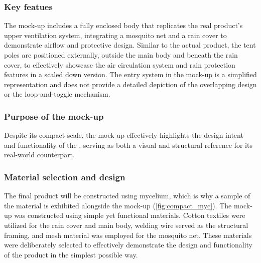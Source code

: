 \documentclass{article}
\begin{document}
\subsubsection{Key featues}
The mock-up includes a fully enclosed body that replicates the real product’s upper
ventilation system, integrating a mosquito net and a rain cover to demonstrate airflow
and protective design. Similar to the actual product, the tent poles are positioned
externally, outside the main body and beneath the rain cover, to effectively showcase the
air circulation system and rain protection features in a scaled down version. The entry
system in the mock-up is a simplified representation and does not provide a detailed
depiction of the overlapping design or the loop-and-toggle mechanism.

\subsubsection{Purpose of the mock-up}
Despite its compact scale, the mock-up effectively highlights the design intent and
functionality of the \myc, serving as both a visual and structural reference for
its real-world counterpart.

\subsubsection{Material selection and design}
The final product will be constructed using mycelium, which is why a sample of the material
is exhibited alongside the mock-up (\autoref{fig:compact_myc}). The mock-up was constructed
using simple yet functional materials. Cotton textiles were utilized for the rain cover and
main body, welding wire served as the structural framing, and mesh material was employed
for the mosquito net. These materials were deliberately selected to effectively demonstrate
the design and functionality of the product in the simplest possible way.
\end{document}
